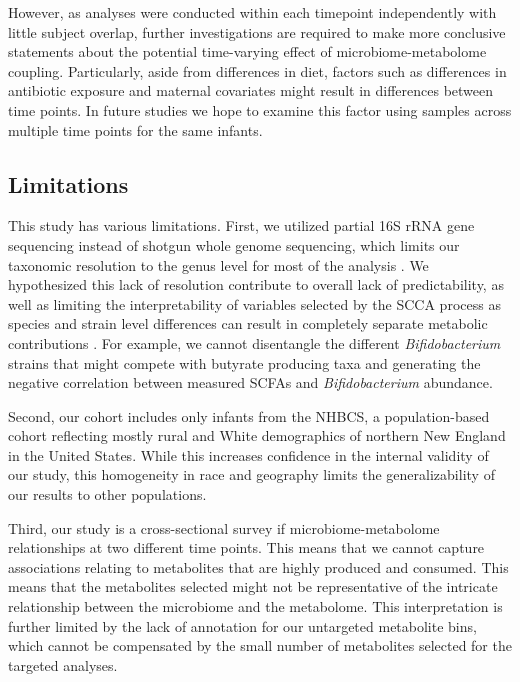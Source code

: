 However, as analyses were conducted within each timepoint independently with little subject overlap, further investigations are required to make more conclusive statements about the potential time-varying effect of microbiome-metabolome coupling. Particularly, aside from differences in diet, factors such as differences in antibiotic exposure \cite{coker2020specific} and maternal covariates \cite{lundgren2018maternal} might result in differences between time points. In future studies we hope to examine this factor using samples across multiple time points for the same infants.  

\subsection{Limitations}

This study has various limitations. First, we utilized partial 16S rRNA gene sequencing instead of shotgun whole genome sequencing, which limits our taxonomic resolution to the genus level for most of the analysis \cite{zhang2016strainlevel}. We hypothesized this lack of resolution contribute to overall lack of predictability, as well as limiting the interpretability of variables selected by the SCCA process as species and strain level differences can result in completely separate metabolic contributions \cite{lloyd-price2017strains}. For example, we cannot disentangle the different \emph{Bifidobacterium} strains that might compete with butyrate producing taxa and generating the negative correlation between measured SCFAs and \emph{Bifidobacterium} abundance.  

Second, our cohort includes only infants from the NHBCS, a population-based cohort reflecting mostly rural and White demographics of northern New England in the United States. While this increases confidence in the internal validity of our study, this homogeneity in race and geography limits the generalizability of our results to other populations. 

Third, our study is a cross-sectional survey if microbiome-metabolome relationships at two different time points. This means that we cannot capture associations relating to metabolites that are highly produced and consumed. This means that the metabolites selected might not be representative of the intricate relationship between the microbiome and the metabolome. This interpretation is further limited by the lack of annotation for our untargeted metabolite bins, which cannot be compensated by the small number of metabolites selected for the targeted analyses. 

